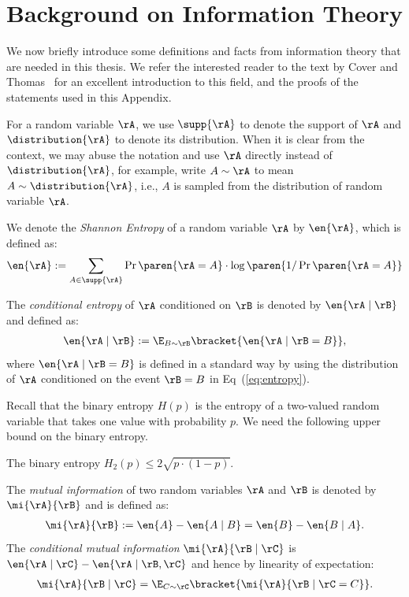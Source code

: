 \section{Background on Information Theory}\label{prelim-sec:info}

We now briefly introduce some definitions and facts from information theory that are needed in this thesis. We refer the interested reader to the text by Cover and Thomas~\cite{CoverT06} for an excellent introduction to this field, 
and the proofs of the statements used in this Appendix. 

For a random variable $\rA$, we use $\supp{\rA}$ to denote the support of $\rA$ and $\distribution{\rA}$ to denote its distribution. 
When it is clear from the context, we may abuse the notation and use $\rA$ directly instead of $\distribution{\rA}$, for example, write 
$A \sim \rA$ to mean $A \sim \distribution{\rA}$, i.e., $A$ is sampled from the distribution of random variable $\rA$. 


We denote the \emph{Shannon Entropy} of a random variable $\rA$ by
$\en{\rA}$, which is defined as: 
\begin{align}
	\en{\rA} := \sum_{A \in \supp{\rA}} \Pr\paren{\rA = A} \cdot \log{\paren{1/\Pr\paren{\rA = A}}} \label{eq:entropy}
\end{align} 

\noindent
The \emph{conditional entropy} of $\rA$ conditioned on $\rB$ is denoted by $\en{\rA \mid \rB}$ and defined as:
\begin{align}
\en{\rA \mid \rB} := \E_{B \sim \rB} \bracket{\en{\rA \mid \rB = B}}, \label{eq:cond-entropy}
\end{align}
where 
$\en{\rA \mid \rB = B}$ is defined in a standard way by using the distribution of $\rA$ conditioned on the event $\rB = B$ in Eq~(\ref{eq:entropy}). 

\noindent
Recall that the binary entropy $H(p)$ is the entropy of a two-valued random
variable that takes one value with probability $p$.
We need the following upper bound on the binary entropy.

\begin{fact}\label{fact:ent-ub}
  The binary entropy $H_2(p) \leq 2 \sqrt{ p \cdot (1 - p) }$.
\end{fact}


 
The \emph{mutual information} of two random variables $\rA$ and $\rB$ is denoted by
$\mi{\rA}{\rB}$ and is defined as:
\begin{align}
\mi{\rA}{\rB} := \en{A} - \en{A \mid  B} = \en{B} - \en{B \mid  A}. \label{eq:mi}
\end{align}
\noindent
The \emph{conditional mutual information} $\mi{\rA}{\rB \mid \rC}$ is $\en{\rA \mid \rC} - \en{\rA \mid \rB,\rC}$ and hence by linearity of expectation:
\begin{align}
	\mi{\rA}{\rB \mid \rC} = \E_{C \sim \rC} \bracket{\mi{\rA}{\rB \mid \rC = C}}. \label{eq:cond-mi}
\end{align} 



